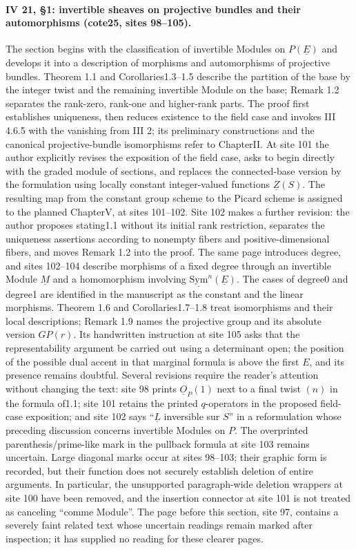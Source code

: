 \documentclass[10pt,a4paper]{article}
\begin{document}
\paragraph{IV 21, \S1: invertible sheaves on projective bundles and their automorphisms (cote25, sites 98--105).}
The section begins with the classification of invertible Modules on $P(\underline E)$ and develops it into a description of morphisms and automorphisms of projective bundles. Theorem 1.1 and Corollaries1.3--1.5 describe the partition of the base by the integer twist and the remaining invertible Module on the base; Remark 1.2 separates the rank-zero, rank-one and higher-rank parts. The proof first establishes uniqueness, then reduces existence to the field case and invokes III 4.6.5 with the vanishing from III 2; its preliminary constructions and the canonical projective-bundle isomorphisms refer to ChapterII. At site 101 the author explicitly revises the exposition of the field case, asks to begin directly with the graded module of sections, and replaces the connected-base version by the formulation using locally constant integer-valued functions $\underline Z(S)$. The resulting map from the constant group scheme to the Picard scheme is assigned to the planned ChapterV, at sites 101--102. Site 102 makes a further revision: the author proposes stating1.1 without its initial rank restriction, separates the uniqueness assertions according to nonempty fibers and positive-dimensional fibers, and moves Remark 1.2 into the proof. The same page introduces degree, and sites 102--104 describe morphisms of a fixed degree through an invertible Module $\underline M$ and a homomorphism involving $\underline{\mathrm{Sym}}^n(\underline E)$. The cases of degree0 and degree1 are identified in the manuscript as the constant and the linear morphisms. Theorem 1.6 and Corollaries1.7--1.8 treat isomorphisms and their local descriptions; Remark 1.9 names the projective group and its absolute version $GP(r)$. Its handwritten instruction at site 105 asks that the representability argument be carried out using a determinant open; the position of the possible dual accent in that marginal formula is above the first $E$, and its presence remains doubtful. Several revisions require the reader's attention without changing the text: site 98 prints $\underline O_P(1)$ next to a final twist $(n)$ in the formula of1.1; site 101 retains the printed $q$-operators in the proposed field-case exposition; and site 102 says ``$\underline L$ inversible sur $S$'' in a reformulation whose preceding discussion concerns invertible Modules on $P$. The overprinted parenthesis/prime-like mark in the pullback formula at site 103 remains uncertain. Large diagonal marks occur at sites 98--103; their graphic form is recorded, but their function does not securely establish deletion of entire arguments. In particular, the unsupported paragraph-wide deletion wrappers at site 100 have been removed, and the insertion connector at site 101 is not treated as canceling ``comme Module''. The page before this section, site 97, contains a severely faint related text whose uncertain readings remain marked after inspection; it has supplied no reading for these clearer pages.
\par{}
\end{document}
